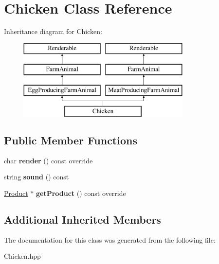 \hypertarget{class_chicken}{}\section{Chicken Class Reference}
\label{class_chicken}
Inheritance diagram for Chicken\+:\begin{figure}[H]
\begin{center}
\leavevmode
\includegraphics[height=4.000000cm]{class_chicken}
\end{center}
\end{figure}
\subsection*{Public Member Functions}
\begin{DoxyCompactItemize}
\item 
\mbox{\label{class_chicken_a70b47acc255594170013d22b7ddc380a}} 
char {\bfseries render} () const override
\item 
\mbox{\label{class_chicken_a27728c33377c3d2c8092855f494bb346}} 
string {\bfseries sound} () const
\item 
\mbox{\label{class_chicken_a9ba610aec45202dc74b3fd358d5ab528}} 
\mbox{\hyperlink{class_product}{Product}} $\ast$ {\bfseries get\+Product} () const override
\end{DoxyCompactItemize}
\subsection*{Additional Inherited Members}


The documentation for this class was generated from the following file\+:\begin{DoxyCompactItemize}
\item 
Chicken.\+hpp\end{DoxyCompactItemize}
